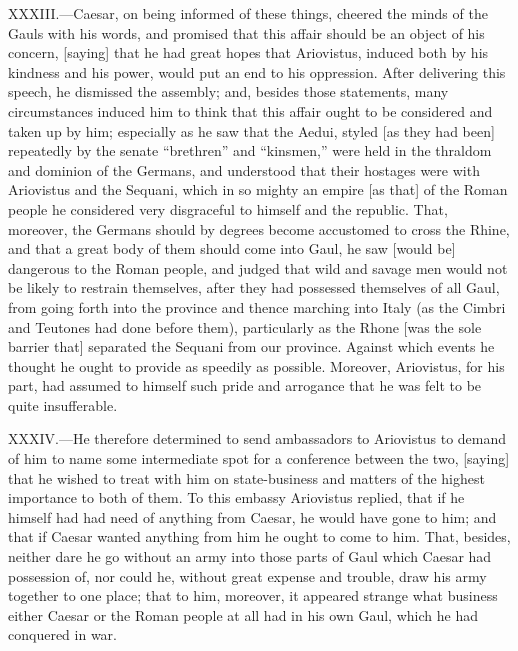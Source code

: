 XXXIII.—Caesar, on being informed of these things, cheered the minds of
the Gauls with his words, and promised that this affair should be an
object of his concern, [saying] that he had great hopes that Ariovistus,
induced both by his kindness and his power, would put an end to his
oppression. After delivering this speech, he dismissed the assembly;
and, besides those statements, many circumstances induced him to think
that this affair ought to be considered and taken up by him; especially
as he saw that the Aedui, styled [as they had been] repeatedly by the
senate ``brethren'' and ``kinsmen,'' were held in the thraldom and dominion
of the Germans, and understood that their hostages were with Ariovistus
and the Sequani, which in so mighty an empire [as that] of the Roman
people he considered very disgraceful to himself and the republic. That,
moreover, the Germans should by degrees become accustomed to cross the
Rhine, and that a great body of them should come into Gaul, he saw
[would be] dangerous to the Roman people, and judged that wild and
savage men would not be likely to restrain themselves, after they had
possessed themselves of all Gaul, from going forth into the province and
thence marching into Italy (as the Cimbri and Teutones had done before
them), particularly as the Rhone [was the sole barrier that] separated
the Sequani from our province. Against which events he thought he ought
to provide as speedily as possible. Moreover, Ariovistus, for his part,
had assumed to himself such pride and arrogance that he was felt to be
quite insufferable.

XXXIV.—He therefore determined to send ambassadors to Ariovistus to
demand of him to name some intermediate spot for a conference between
the two, [saying] that he wished to treat with him on state-business and
matters of the highest importance to both of them. To this embassy
Ariovistus replied, that if he himself had had need of anything from
Caesar, he would have gone to him; and that if Caesar wanted anything
from him he ought to come to him. That, besides, neither dare he go
without an army into those parts of Gaul which Caesar had possession of,
nor could he, without great expense and trouble, draw his army together
to one place; that to him, moreover, it appeared strange what business
either Caesar or the Roman people at all had in his own Gaul, which he
had conquered in war.

